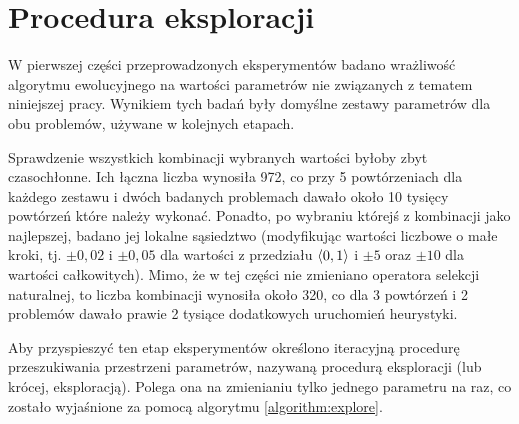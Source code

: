 \documentclass[./FM_mgr.tex]{subfiles}
\begin{document}
\section{Procedura eksploracji} \label{appendix:explore}

W pierwszej części przeprowadzonych eksperymentów badano wrażliwość algorytmu ewolucyjnego na wartości parametrów nie związanych z tematem niniejszej pracy.
Wynikiem tych badań były domyślne zestawy parametrów dla obu problemów, używane w kolejnych etapach.

Sprawdzenie wszystkich kombinacji wybranych wartości byłoby zbyt czasochłonne.
Ich łączna liczba wynosiła 972, co przy 5 powtórzeniach dla każdego zestawu i dwóch badanych problemach dawało około 10 tysięcy powtórzeń które należy wykonać.
Ponadto, po wybraniu którejś z kombinacji jako najlepszej, badano jej lokalne sąsiedztwo (modyfikując wartości liczbowe o małe kroki, tj. $\pm0,02$ i $\pm0,05$ dla wartości z przedziału $\langle0, 1\rangle$ i $\pm5$ oraz $\pm10$ dla wartości całkowitych).
Mimo, że w tej części nie zmieniano operatora selekcji naturalnej, to liczba kombinacji wynosiła około 320, co dla 3 powtórzeń i 2 problemów dawało prawie 2 tysiące dodatkowych uruchomień heurystyki.

Aby przyspieszyć ten etap eksperymentów określono iteracyjną procedurę przeszukiwania przestrzeni parametrów, nazywaną procedurą eksploracji (lub krócej, eksploracją).
Polega ona na zmienianiu tylko jednego parametru na raz, co zostało wyjaśnione za pomocą algorytmu \ref{algorithm:explore}.

\clearpage
\end{document}
